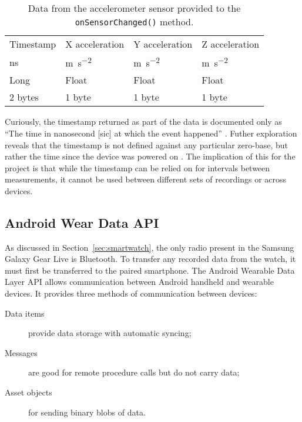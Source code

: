       \begin{table}
        \centering
        \begin{tabu} to \linewidth {|X[2,c] | X[c] | X[c] | X[c] |}
          \hline
          Timestamp & X acceleration & Y acceleration & Z acceleration \\
          \si{ns} & \si{\metre\per\square\second} & \si{\metre\per\square\second} & \si{\metre\per\square\second} \\
          Long & Float & Float & Float \\
          2 bytes & 1 byte & 1 byte & 1 byte \\
          \hline
        \end{tabu}
        \caption{Data from the accelerometer sensor provided to the \texttt{onSensorChanged()} 
            method.}
        \label{tab:data-row}
      \end{table}
      
      Curiously, the timestamp returned as part of the data is documented only as ``The time in nanosecond [sic] at which the event happened'' \cite{androidsensoreventapi}. Futher exploration reveals that the timestamp is not defined against any particular zero-base, but rather the time since the device was powered on \cite{androidissuedocumentationbug, androidissuehardwarebug}. The implication of this for the project is that while the timestamp can be relied on for intervals between measurements, it cannot be used between different sets of recordings or across devices.
      

    \subsection{Android Wear Data API}
      \label{sec:prep-data-api}
      As discussed in Section~\ref{sec:smartwatch}, the only radio present in the Samsung Galaxy 
      Gear Live is Bluetooth. To transfer any recorded data from the watch, it must first be transferred to the paired smartphone. 
      The Android Wearable Data Layer API allows communication between Android handheld and wearable
      devices. It provides three methods of communication between devices:
      \begin{description}
        \item[Data items] provide data storage with automatic syncing;
        \item[Messages] are good for remote procedure calls but do not carry data;
        \item[Asset objects] for sending binary blobs of data.
      \end{description}
      
